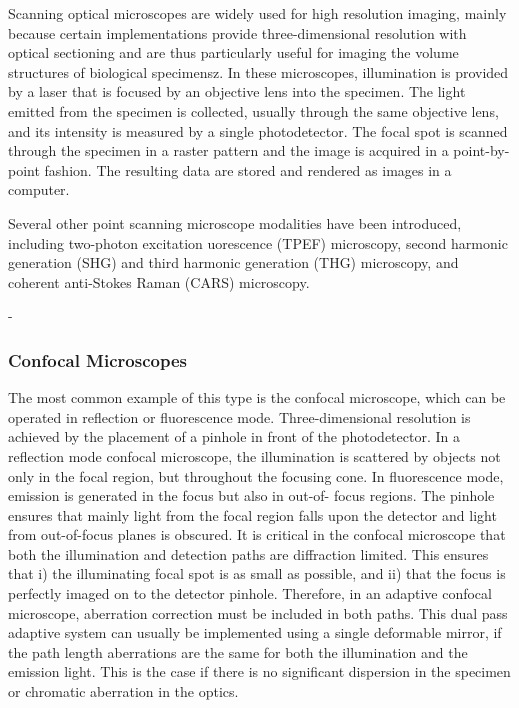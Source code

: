 Scanning optical microscopes are widely used for high resolution imaging, 
mainly because certain implementations provide three-dimensional resolution 
with optical sectioning and are thus particularly useful for imaging the 
volume structures of biological specimensz. In these microscopes, 
illumination is provided by a laser that is focused by an objective lens into 
the specimen. The light emitted from the specimen is collected, usually 
through the same objective lens, and its intensity is measured by a single 
photodetector. The focal spot is scanned through the specimen in a raster 
pattern and the image is acquired in a point-by-point fashion. The resulting 
data are stored and rendered as images in a computer.

Several other point scanning microscope modalities have been introduced, 
including two-photon excitation uorescence (TPEF) microscopy, second harmonic 
generation (SHG) and third harmonic generation (THG) microscopy, and coherent 
anti-Stokes Raman (CARS) microscopy.

-
\subsubsection{Confocal Microscopes}
\label{sec:ConfocalMicroscopes}

The most common example of this type is the confocal microscope, which can be 
operated in reflection or fluorescence mode. Three-dimensional resolution is 
achieved by the placement of a pinhole in front of the photodetector. In a 
reflection mode confocal microscope, the illumination is scattered by objects 
not only in the focal region, but throughout the focusing cone. In 
fluorescence mode, emission is generated in the focus but also in out-of-
focus regions. The pinhole ensures that mainly light from the focal region 
falls upon the detector and light from out-of-focus planes is obscured. It is 
critical in the confocal microscope that both the illumination and detection 
paths are diffraction limited. This ensures that i) the illuminating focal 
spot is as small as possible, and ii) that the focus is perfectly imaged on 
to the detector pinhole. Therefore, in an adaptive confocal microscope, 
aberration correction must be included in both paths. This dual pass adaptive 
system can usually be implemented using a single deformable mirror, if the 
path length aberrations are the same for both the illumination and the 
emission light. This is the case if there is no significant dispersion in the 
specimen or chromatic aberration in the optics.

